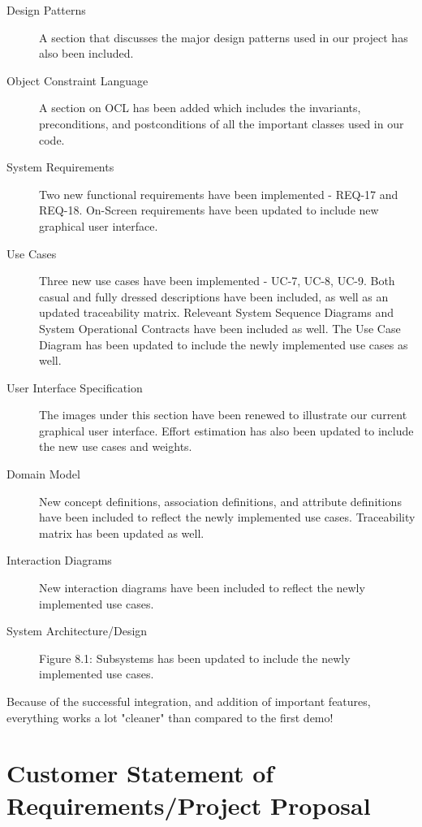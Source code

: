 \documentclass[letterpaper,english, 12pt]{scrreprt}
\begin{document}
\begin{description}
	\item[Design Patterns] A section that discusses the major design patterns used in our project has also been included.
	\item[Object Constraint Language] A section on OCL has been added which includes the invariants, preconditions, and postconditions of all the important classes used in our code.
	\item[System Requirements] Two new functional requirements have been implemented - REQ-17 and REQ-18. On-Screen requirements have been updated to include new graphical user interface.
	\item[Use Cases] Three new use cases have been implemented - UC-7, UC-8, UC-9. Both casual and fully dressed descriptions have been included, as well as an updated traceability matrix. Releveant System Sequence Diagrams and System Operational Contracts have been included as well. The Use Case Diagram has been updated to include the newly implemented use cases as well.
	\item[User Interface Specification] The images under this section have been renewed to illustrate our current graphical user interface. Effort estimation has also been updated to include the new use cases and weights.
	\item[Domain Model] New concept definitions, association definitions, and attribute definitions have been included to reflect the newly implemented use cases. Traceability matrix has been updated as well.
	\item[Interaction Diagrams] New interaction diagrams have been included to reflect the newly implemented use cases.
	\item[System Architecture/Design] Figure 8.1: Subsystems has been updated to include the newly implemented use cases.
\end{description}
Because of the successful integration, and addition of important features, everything works a lot "cleaner" than compared to the first demo!








\chapter{Customer Statement of Requirements/Project Proposal}
 
\end{document}
